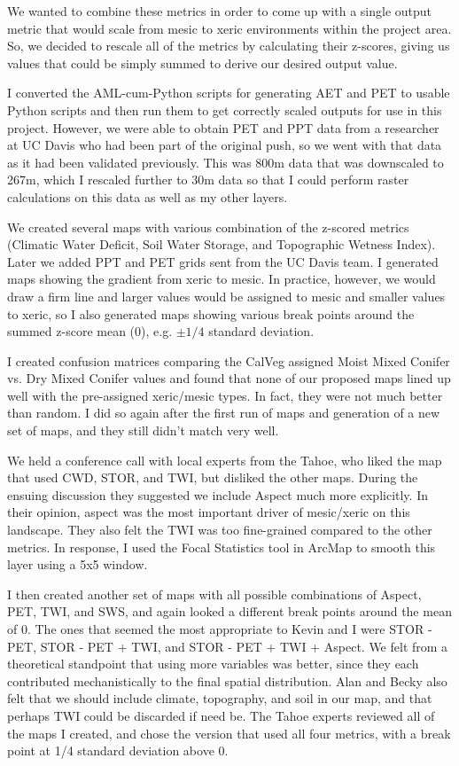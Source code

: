 We wanted to combine these metrics in order to come up with a single output metric that would scale from mesic to xeric environments within the project area. So, we decided to rescale all of the metrics by calculating their z-scores, giving us values that could be simply summed to derive our desired output value.

I converted the AML-cum-Python scripts for generating AET and PET to usable Python scripts and then run them to get correctly scaled outputs for use in this project. However, we were able to obtain PET and PPT data from a researcher at UC Davis who had been part of the original push, so we went with that data as it had been validated previously. This was 800m data that was downscaled to 267m, which I rescaled further to 30m data so that I could perform raster calculations on this data as well as my other layers.

We created several maps with various combination of the z-scored metrics (Climatic Water Deficit, Soil Water Storage, and Topographic Wetness Index). Later we added PPT and PET grids sent from the UC Davis team. I generated maps showing the gradient from xeric to mesic. In practice, however, we would draw a firm line and larger values would be assigned to mesic and smaller values to xeric, so I also generated maps showing various break points around the summed z-score mean (0), e.g. $\pm1/4$ standard deviation. 

I created confusion matrices comparing the CalVeg assigned Moist Mixed Conifer vs. Dry Mixed Conifer values and found that none of our proposed maps lined up well with the pre-assigned xeric/mesic types. In fact, they were not much better than random. I did so again after the first run of maps and generation of a new set of maps, and they still didn't match very well.

We held a conference call with local experts from the Tahoe, who liked the map that used CWD, STOR, and TWI, but disliked the other maps. During the ensuing discussion they suggested we include Aspect much more explicitly. In their opinion, aspect was the most important driver of mesic/xeric on this landscape. They also felt the TWI was too fine-grained compared to the other metrics. In response, I used the Focal Statistics tool in ArcMap to smooth this layer using a 5x5 window.

I then created another set of maps with all possible combinations of Aspect, PET, TWI, and SWS, and again looked a different break points around the mean of 0. The ones that seemed the most appropriate to Kevin and I were STOR - PET, STOR - PET + TWI, and STOR - PET + TWI + Aspect. We felt from a theoretical standpoint that using more variables was better, since they each contributed mechanistically to the final spatial distribution. Alan and Becky also felt that we should include climate, topography, and soil in our map, and that perhaps TWI could be discarded if need be. The Tahoe experts reviewed all of the maps I created, and chose the version that used all four metrics, with a break point at 1/4 standard deviation above 0.

